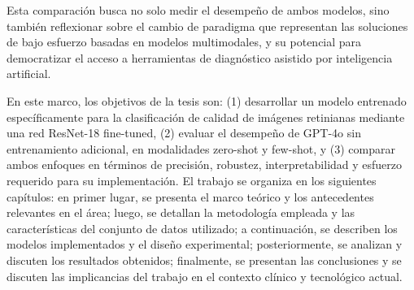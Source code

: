 Esta comparación busca no solo medir el desempeño de ambos modelos, sino también reflexionar sobre el cambio de paradigma que representan las soluciones de bajo esfuerzo basadas en modelos multimodales, y su potencial para democratizar el acceso a herramientas de diagnóstico asistido por inteligencia artificial.

En este marco, los objetivos de la tesis son: (1) desarrollar un modelo entrenado específicamente para la clasificación de calidad de imágenes retinianas mediante una red ResNet-18 fine-tuned, (2) evaluar el desempeño de GPT-4o sin entrenamiento adicional, en modalidades zero-shot y few-shot, y (3) comparar ambos enfoques en términos de precisión, robustez, interpretabilidad y esfuerzo requerido para su implementación. El trabajo se organiza en los siguientes capítulos: en primer lugar, se presenta el marco teórico y los antecedentes relevantes en el área; luego, se detallan la metodología empleada y las características del conjunto de datos utilizado; a continuación, se describen los modelos implementados y el diseño experimental; posteriormente, se analizan y discuten los resultados obtenidos; finalmente, se presentan las conclusiones y se discuten las implicancias del trabajo en el contexto clínico y tecnológico actual.
